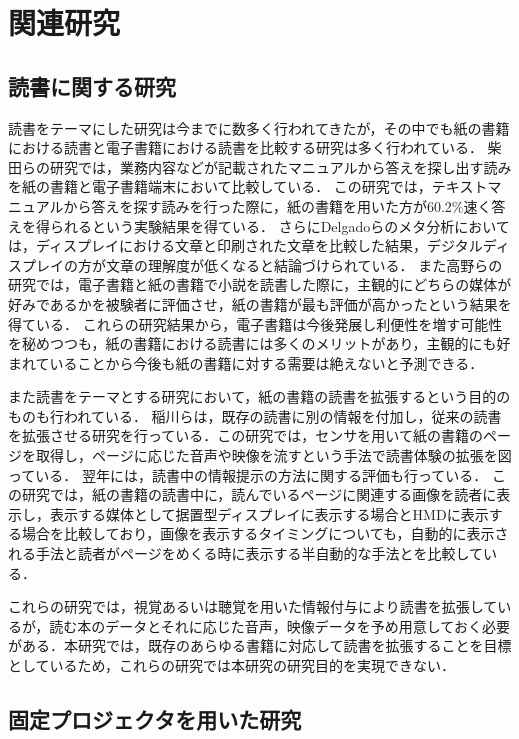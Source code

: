 \section{関連研究}

\subsection{読書に関する研究}

読書をテーマにした研究は今までに数多く行われてきたが，その中でも紙の書籍における読書と電子書籍における読書を比較する研究は多く行われている．
柴田らの研究では，業務内容などが記載されたマニュアルから答えを探し出す読みを紙の書籍と電子書籍端末において比較している\cite{shibata}．
この研究では，テキストマニュアルから答えを探す読みを行った際に，紙の書籍を用いた方が60.2\%速く答えを得られるという実験結果を得ている．
さらにDelgadoらのメタ分析においては，ディスプレイにおける文章と印刷された文章を比較した結果，デジタルディスプレイの方が文章の理解度が低くなると結論づけられている\cite{pablo}．
また高野らの研究では，電子書籍と紙の書籍で小説を読書した際に，主観的にどちらの媒体が好みであるかを被験者に評価させ，紙の書籍が最も評価が高かったという結果を得ている\cite{takano}．
これらの研究結果から，電子書籍は今後発展し利便性を増す可能性を秘めつつも，紙の書籍における読書には多くのメリットがあり，主観的にも好まれていることから今後も紙の書籍に対する需要は絶えないと予測できる．

また読書をテーマとする研究において，紙の書籍の読書を拡張するという目的のものも行われている．
稲川らは，既存の読書に別の情報を付加し，従来の読書を拡張させる研究を行っている\cite{inagawa1}．この研究では，センサを用いて紙の書籍のページを取得し，ページに応じた音声や映像を流すという手法で読書体験の拡張を図っている．
翌年には，読書中の情報提示の方法に関する評価も行っている\cite{inagawa2}．
この研究では，紙の書籍の読書中に，読んでいるページに関連する画像を読者に表示し，表示する媒体として据置型ディスプレイに表示する場合とHMDに表示する場合を比較しており，画像を表示するタイミングについても，自動的に表示される手法と読者がページをめくる時に表示する半自動的な手法とを比較している．

これらの研究では，視覚あるいは聴覚を用いた情報付与により読書を拡張しているが，読む本のデータとそれに応じた音声，映像データを予め用意しておく必要がある．本研究では，既存のあらゆる書籍に対応して読書を拡張することを目標としているため，これらの研究では本研究の研究目的を実現できない．


\subsection{固定プロジェクタを用いた研究}

